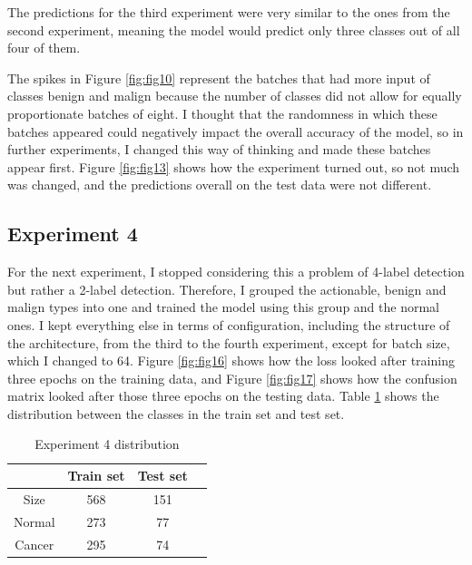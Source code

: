 The predictions for the third experiment were very similar to the ones from the second experiment, meaning the model would predict only three classes out of all four of them.

The spikes in Figure \ref{fig:fig10} represent the batches that had more input of classes benign and malign because the number of classes did not allow for equally proportionate batches of eight. I thought that the randomness in which these batches appeared could negatively impact the overall accuracy of the model, so in further experiments, I changed this way of thinking and made these batches appear first. Figure \ref{fig:fig13} shows how the experiment turned out, so not much was changed, and the predictions overall on the test data were not different.

\subsection{Experiment 4}

For the next experiment, I stopped considering this a problem of 4-label detection but rather a 2-label detection. Therefore, I grouped the actionable, benign and malign types into one and trained the model using this group and the normal ones. I kept everything else in terms of configuration, including the structure of the architecture, from the third to the fourth experiment, except for batch size, which I changed to 64. Figure \ref{fig:fig16} shows how the loss looked after training three epochs on the training data, and Figure \ref{fig:fig17} shows how the confusion matrix looked after those three epochs on the testing data. Table \ref{tab:tab2} shows the distribution between the classes in the train set and test set.

\begin{table}[ht!]
\centering
\begin{tabular}{|c|c|c|c|}
    \hline
     & Train set & Test set \\ \hline
    Size & 568 & 151 \\ \hline
    Normal & 273 & 77\\ \hline
    Cancer & 295 & 74\\ \hline
    \end{tabular}
    \caption{Experiment 4 distribution}
    \label{tab:tab2}
\end{table}

